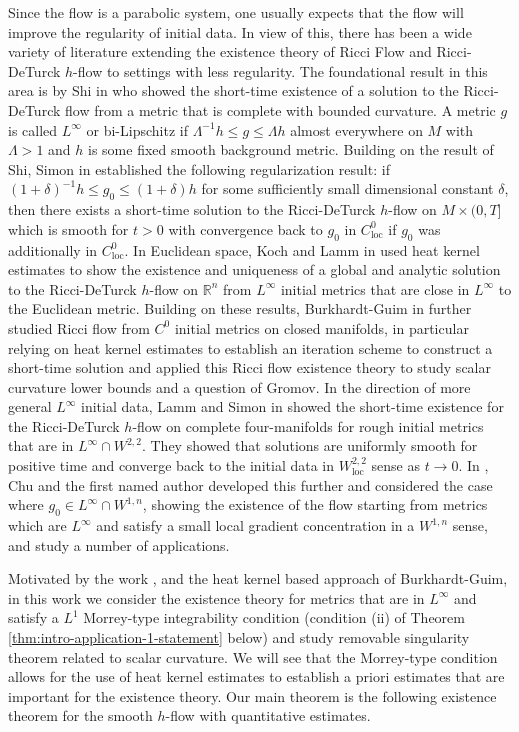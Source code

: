 \documentclass[12pt]{amsart}
\theoremstyle{plain}
\theoremstyle{plain}
\theoremstyle{definition}
\theoremstyle{remark}
\numberwithin{equation}{subsection}
\begin{document}
Since the flow is a parabolic system, one usually expects that the flow will improve the regularity of initial data. In view of this, there has been a wide variety of literature extending the existence theory of Ricci Flow and Ricci-DeTurck $h$-flow to settings with less regularity. The foundational result in this area is by Shi in \cite{shi_deforming_1989} who showed the short-time existence of a solution to the Ricci-DeTurck flow from a metric that is complete with bounded curvature. A metric $g$ is called $L^\infty$ or bi-Lipschitz if $\Lambda^{-1}h \leq g \leq \Lambda h$ almost everywhere on $M$ with $\Lambda >1$ and $h$ is some fixed smooth background metric. Building on the result of Shi, Simon in \cite{simon_deformation_2002} established the following regularization result: if $(1+\delta)^{-1}h \leq g_0 \leq (1+\delta)h$ for some sufficiently small dimensional constant $\delta$, then there exists a short-time solution to the Ricci-DeTurck $h$-flow on $M \times (0,T]$ which is smooth for $t > 0$ with convergence back to $g_0$ in $C^0_\text{loc}$ if $g_0$ was additionally in $C^0_\text{loc}$. In Euclidean space, Koch and Lamm in \cite{koch_geometric_2012} used heat kernel estimates to show the existence and uniqueness of a global and analytic solution to the Ricci-DeTurck $h$-flow on $\mathbb{R}^n$ from $L^\infty$ initial metrics that are close in $L^\infty$ to the Euclidean metric. Building on these results, Burkhardt-Guim in \cite{burkhardt-guim_pointwise_2019} further studied Ricci flow from $C^0$ initial metrics on closed manifolds, in particular relying on heat kernel estimates to establish an iteration scheme to construct a short-time solution and applied this Ricci flow existence theory to study scalar curvature lower bounds and a question of Gromov. In the direction of more general $L^\infty$ initial data, Lamm and Simon in \cite{lamm_ricci_2021} showed the short-time existence for the Ricci-DeTurck $h$-flow on complete four-manifolds for rough initial metrics that are in $L^\infty \cap W^{2,2}$. They showed that solutions are uniformly smooth for positive time and converge back to the initial data in $W^{2,2}_\text{loc}$ sense as $t\to0$. In \cite{chu_ricci-deturck_2022}, Chu and the first named author developed this further and considered the case where $g_0 \in L^\infty \cap W^{1,n}$, showing the existence of the flow starting from metrics which are $L^\infty$ and satisfy a small local gradient concentration in a $W^{1,n}$ sense, and study a number of applications.

Motivated by the work \cite{chu_ricci-deturck_2022}, and the heat kernel based approach of Burkhardt-Guim, in this work we consider the existence theory for metrics that are in $L^\infty$ and satisfy a $L^1$ Morrey-type integrability condition (condition (ii) of Theorem \ref{thm:intro-application-1-statement} below) and study removable singularity theorem related to scalar curvature. We will see that the Morrey-type condition allows for the use of heat kernel estimates to establish a priori estimates that are important for the existence theory. Our main theorem is the following existence theorem for the smooth $h$-flow with quantitative estimates.
\end{document}
